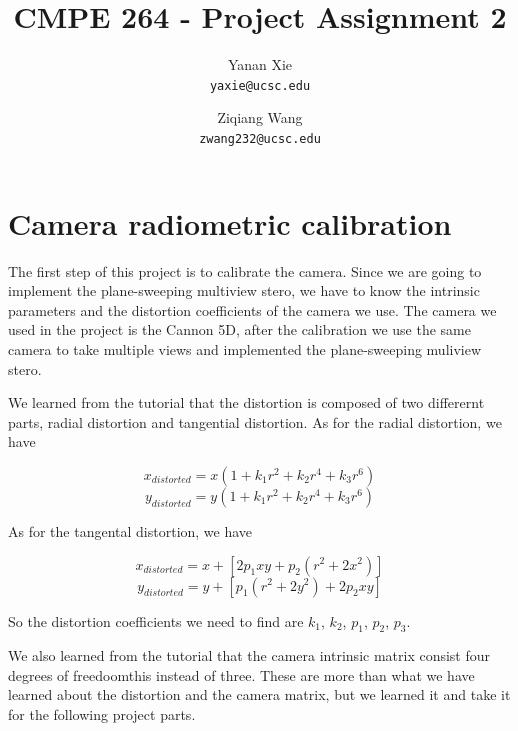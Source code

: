 \documentclass[10pt,twocolumn,letterpaper]{article}
\begin{document}
\title{CMPE 264 - Project Assignment 2}

\author{Yanan Xie\\
{\tt\small yaxie@ucsc.edu}
\and
Ziqiang Wang\\
{\tt\small zwang232@ucsc.edu}
}

\maketitle


\section{Camera radiometric calibration}
The first step of this project is to calibrate the camera. Since we are going to implement the plane-sweeping multiview stero, we have to know the intrinsic parameters and the distortion coefficients of the camera we use. The camera we used in the project is the Cannon 5D, after the calibration we use the same camera to take multiple views and implemented the plane-sweeping muliview stero. 


We learned from the tutorial that the distortion is composed of two differernt parts, radial distortion and tangential distortion. As for the radial distortion, we have 

$$x_{distorted} = x(1+k_{1}r^{2}+k_{2}r^{4}+k_{3}r^{6})$$
$$y_{distorted} = y(1+k_{1}r^{2}+k_{2}r^{4}+k_{3}r^{6})$$

As for the tangental distortion, we have 

$$x_{distorted} = x+[2p_{1}xy+p_{2}(r^{2}+2x^{2})]$$
$$y_{distorted} = y+[p_{1}(r^{2}+2y^{2})+2p_{2}xy]$$

So the distortion coefficients we need to find are $k_{1}$, $k_{2}$, $p_{1}$, $p_{2}$, $p_{3}$.

We also learned from the tutorial that the camera intrinsic matrix consist four degrees of freedoomthis instead of three. These are more than what we have learned about the distortion and the camera matrix, but we learned it and take it for the following project parts. 
\end{document}
